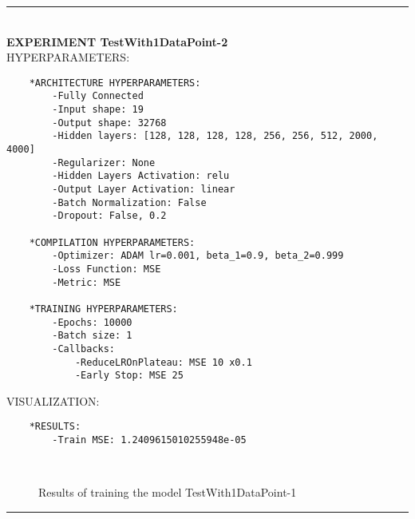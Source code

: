 \rule{0.5\textwidth}{0.5pt}\\

	{\large \textbf{EXPERIMENT TestWith1DataPoint-2}}\\
	
	{\normalsize HYPERPARAMETERS:}
	\begin{lstlisting}
	*ARCHITECTURE HYPERPARAMETERS:
		-Fully Connected
		-Input shape: 19
		-Output shape: 32768
		-Hidden layers: [128, 128, 128, 128, 256, 256, 512, 2000, 4000]
		-Regularizer: None
		-Hidden Layers Activation: relu
		-Output Layer Activation: linear
		-Batch Normalization: False
		-Dropout: False, 0.2
	
	*COMPILATION HYPERPARAMETERS:
		-Optimizer: ADAM lr=0.001, beta_1=0.9, beta_2=0.999
		-Loss Function: MSE
		-Metric: MSE
	
	*TRAINING HYPERPARAMETERS:
		-Epochs: 10000
		-Batch size: 1
		-Callbacks: 
			-ReduceLROnPlateau: MSE 10 x0.1
			-Early Stop: MSE 25
	\end{lstlisting}
	
	{\normalsize VISUALIZATION:}
	\begin{lstlisting}
	*RESULTS:
        -Train MSE: 1.2409615010255948e-05
	\end{lstlisting}
	
	\begin{figure*}[ht!]
		\hspace{\fill}
		\hspace{\fill}	
		\\
		\caption{Results of training the model TestWith1DataPoint-1}
	\end{figure*}
	
\FloatBarrier	
\rule{0.5\textwidth}{0.5pt}\\